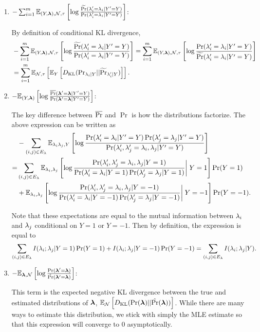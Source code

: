 \begin{enumerate}
    \item $ -\sum_{i = 1}^m \mathbb{E}_{(Y, \bm{\lambda}), \mathcal{N}, \tau}\left[\log \frac{\widetilde{\Pr}(\lambda_i' = \lambda_i | Y' = Y)}{\Pr(\lambda_i' = \lambda_i | Y' = Y)}\right]$:
    
    By definition of conditional KL divergence,
    \begin{align}
        &-\sum_{i = 1}^m \mathbb{E}_{(Y, \bm{\lambda}), \mathcal{N}, \tau}\left[\log \frac{\widetilde{\Pr}(\lambda_i' = \lambda_i | Y' = Y)}{\Pr(\lambda_i' = \lambda_i | Y' = Y)}\right] = \sum_{i = 1}^m \mathbb{E}_{(Y, \bm{\lambda}), \mathcal{N}, \tau}\left[ \log \frac{\Pr(\lambda_i' = \lambda_i | Y' = Y )}{\widetilde{\Pr}(\lambda_i' = \lambda_i | Y' = Y)}\right] \\
        &=\sum_{i = 1}^m \mathbb{E}_{\mathcal{N}, \tau}\left[\mathbb{E}_{Y}\left[D_{\mathrm{KL}}(\mathrm{Pr}_{\lambda_i | Y} || \widetilde{\Pr}_{\lambda_i' | Y})\right]\right].
    \end{align}
    
    \item $- \mathbb{E}_{(Y, \bm{\lambda})}\left[\log \frac{\overline{\Pr}(\bm{\lambda}' = \bm{\lambda} | Y' = Y)}{\Pr(\bm{\lambda}' = \bm{\lambda} | Y' = Y)}\right]$:

    The key difference between $\overline{\Pr}$ and $\Pr$ is how the distributions factorize. The above expression can be written as
    \begin{align*}
    &-\sum_{(i, j) \in E_{\lambda}} \mathbb{E}_{\lambda_i \lambda_j, Y}\left[\log \frac{\Pr(\lambda_i' = \lambda_i | Y' = Y) \Pr(\lambda_j' = \lambda_j | Y' = Y)}{\Pr(\lambda_i', \lambda_j' = \lambda_i, \lambda_j | Y' = Y)}\right] \\
    =& \sum_{(i, j) \in E_{\lambda}} \mathbb{E}_{\lambda_i, \lambda_j}\left[ \log \frac{\Pr(\lambda_i', \lambda_j' = \lambda_i, \lambda_j | Y = 1)}{\Pr(\lambda_i' = \lambda_i | Y = 1) \Pr(\lambda_j' = \lambda_j | Y = 1)} \bigg| \; Y = 1\right] \Pr(Y = 1)  \\
    &+ \mathbb{E}_{\lambda_i, \lambda_j}\left[ \log \frac{\Pr(\lambda_i', \lambda_j' = \lambda_i, \lambda_j | Y = -1)}{\Pr(\lambda_i' = \lambda_i | Y = -1) \Pr(\lambda_j' = \lambda_j | Y = -1)} \bigg| \; Y = -1\right] \Pr(Y = -1).
    \end{align*}
    
    Note that these expectations are equal to the mutual information between $\lambda_i$ and $\lambda_j$ conditional on $Y = 1$ or $Y = -1$. Then by definition, the expression is equal to
    \begin{align*}
    \sum_{(i, j) \in E_{\lambda}} I(\lambda_i; \lambda_j | Y = 1) \Pr(Y = 1) + I(\lambda_i; \lambda_j | Y = -1) \Pr(Y = -1) = \sum_{(i, j) \in E_{\lambda}} I(\lambda_i; \lambda_j | Y).
    \end{align*}


    \item $-\mathbb{E}_{\bm{\lambda}, \mathcal{N}}\left[\log \frac{\Pr(\bm{\lambda}' = \bm{\lambda})}{\hat{\Pr}(\bm{\lambda}' = \bm{\lambda})}\right]$: 
    
    This term is the expected negative KL divergence between the true and estimated distributions of $\bm{\lambda}$, $\mathbb{E}_{\mathcal{N}}\left[D_{\mathrm{KL}}(\Pr(\bm{\lambda}) || \hat{\Pr}(\bm{\lambda}))\right]$. While there are many ways to estimate this distribution, we stick with simply the MLE estimate so that this expression will converge to $0$ asymptotically. 
\end{enumerate}


